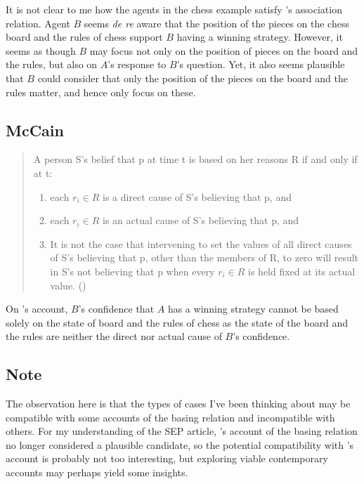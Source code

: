 \documentclass[10pt]{article}
\begin{document}
It is not clear to me how the agents in the chess example satisfy \citeauthor{Moser:1991aa}'s association relation.
Agent \(B\) seems \emph{de re} aware that the position of the pieces on the chess board and the rules of chess support \(B\) having a winning strategy.
However, it seems as though \(B\) may focus not only on the position of pieces on the board and the rules, but also on \(A\)'s response to \(B\)'s question.
Yet, it also seems plausible that \(B\) could consider that only the position of the pieces on the board and the rules matter, and hence only focus on these.

\subsection{McCain}
\label{sec:mccain}

\begin{quote}
  A person S’s belief that p at time t is based on her reasons R if and only if at t:
  \begin{enumerate}
  \item each \(r_{i} \in R\) is a direct cause of S’s believing that p, and
  \item each \(r_{i} \in R\) is an actual cause of S’s believing that p, and
  \item It is not the case that intervening to set the values of all direct causes of S’s believing that p, other than the members of R, to zero will result in S’s not believing that p when every \(r_{i} \in R\) is held fixed at its actual value.\nolinebreak
  \mbox{}\hfill\mbox{(\citeyear[364]{McCain:2012aa})}
  \end{enumerate}
\end{quote}

On \citeauthor{McCain:2012aa}'s account, \(B\)'s confidence that \(A\) has a winning strategy cannot be based solely on the state of board and the rules of chess as the state of the board and the rules are neither the direct nor actual cause of \(B\)'s confidence.

\subsection{Note}
\label{sec:note}

The observation here is that the types of cases I've been thinking about may be compatible with some accounts of the basing relation and incompatible with others.
For my understanding of the SEP article, \citeauthor{Moser:1991aa}'s account of the basing relation no longer considered a plausible candidate, so the potential compatibility with \citeauthor{Moser:1991aa}'s account is probably not too interesting, but exploring viable contemporary accounts may perhaps yield some insights.
\end{document}
